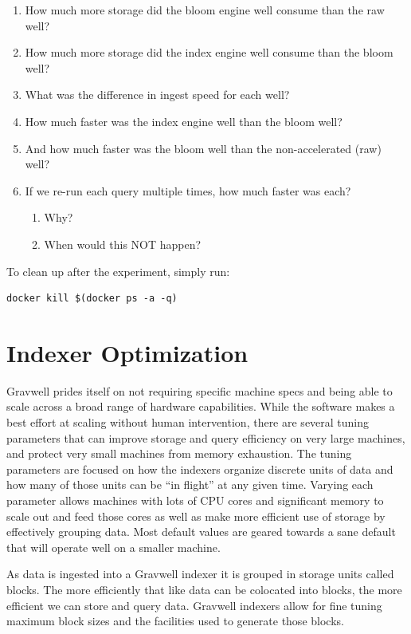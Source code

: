 \begin{enumerate}
\item How much more storage did the bloom engine well consume than the raw well?
\item How much more storage did the index engine well consume than the bloom well?
\item What was the difference in ingest speed for each well?
\item How much faster was the index engine well than the bloom well?
\item And how much faster was the bloom well than the non-accelerated (raw) well?
\item If we re-run each query multiple times, how much faster was each?
	\begin{enumerate}
	\item Why?
	\item When would this NOT happen?
	\end{enumerate}
\end{enumerate}

To clean up after the experiment, simply run:

\begin{Verbatim}[breaklines=true]
docker kill $(docker ps -a -q)
\end{Verbatim}

\section{Indexer Optimization}
Gravwell prides itself on not requiring specific machine specs and
being able to scale across a broad range of hardware capabilities.
While the software makes a best effort at scaling without human
intervention, there are several tuning parameters that can improve
storage and query efficiency on very large machines, and protect very
small machines from memory exhaustion. The tuning parameters are
focused on how the indexers organize discrete units of data and how
many of those units can be ``in flight'' at any given time. Varying
each parameter allows machines with lots of CPU cores and significant
memory to scale out and feed those cores as well as make more efficient
use of storage by effectively grouping data. Most default values are
geared towards a sane default that will operate well on a smaller
machine.

As data is ingested into a Gravwell indexer it is grouped in storage
units called blocks. The more efficiently that like data can be
colocated into blocks, the more efficient we can store and query data.
Gravwell indexers allow for fine tuning maximum block sizes and the
facilities used to generate those blocks.

